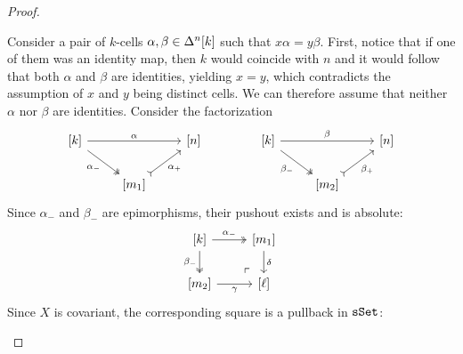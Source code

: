 \begin{proof}
\begin{itemize}
\begin{enumerate}[(i)]
                        Consider a pair of \(k\)-cells \(\alpha, \beta \in \Delta^n[k]\) such that
                        \(x \alpha = y \beta\). First, notice that if one of them was an identity map,
                        then \(k\) would coincide with \(n\) and it would follow that both \(\alpha\)
                        and \(\beta\) are identities, yielding \(x = y\), which contradicts the
                        assumption of \(x\) and \(y\) being distinct cells. We can therefore assume
                        that neither \(\alpha\) nor \(\beta\) are identities. Consider the
                        factorization
                        \[
                            \begin{tikzcd}
                                {[k]} \ar[rr, "\alpha"]
                                \ar[rd, two heads, "\alpha_{-}"']
                                &&{[n]} \\
                                &{[m_1]} \ar[ru, tail, "\alpha_{+}"'] &
                            \end{tikzcd}
                            \qquad
                            \qquad
                            \begin{tikzcd}
                                {[k]} \ar[rr, "\beta"]
                                \ar[rd, two heads, "\beta_{-}"']
                                & &{[n]}
                                \\
                                &{[m_2]} \ar[ru, tail, "\beta_{+}"'] &
                            \end{tikzcd}
                        \]
                        Since \(\alpha_{-}\) and \(\beta_{-}\) are epimorphisms, their pushout exists
                        and is absolute:
                        \begin{equation}\label{eq:pushout-proving-p-is-monic}
                            \begin{tikzcd}
                                {[k]} \ar[r, "\alpha_{-}", two heads]
                                \ar[d, two heads, "\beta_{-}"']
                                \ar[dr, phantom, very near end, "\ulcorner"]
                                &{[m_1]} \ar[d, "\delta"] \\
                                {[m_2]} \ar[r, "\gamma"']
                                &{[\ell]}
                            \end{tikzcd}
                        \end{equation}
                        Since \(X\) is covariant, the corresponding square is a pullback in \({\texttt{sSet}}\):

\end{enumerate}
\end{itemize}
\end{proof}
